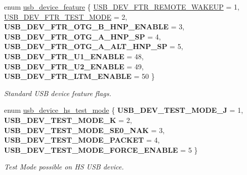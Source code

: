\begin{DoxyCompactItemize}
\item 
enum \hyperlink{group__usb__protocol__group_gab9975b89ad7079085d0300eab037c3ac}{usb\+\_\+device\+\_\+feature} \{ \newline
\hyperlink{group__usb__protocol__group_ggab9975b89ad7079085d0300eab037c3aca378d8545d6f4c12da1249e18e2b18e60}{U\+S\+B\+\_\+\+D\+E\+V\+\_\+\+F\+T\+R\+\_\+\+R\+E\+M\+O\+T\+E\+\_\+\+W\+A\+K\+E\+UP} = 1, 
\hyperlink{group__usb__protocol__group_ggab9975b89ad7079085d0300eab037c3aca127ceb074daad1874fc9c41f5db1c557}{U\+S\+B\+\_\+\+D\+E\+V\+\_\+\+F\+T\+R\+\_\+\+T\+E\+S\+T\+\_\+\+M\+O\+DE} = 2, 
{\bfseries U\+S\+B\+\_\+\+D\+E\+V\+\_\+\+F\+T\+R\+\_\+\+O\+T\+G\+\_\+\+B\+\_\+\+H\+N\+P\+\_\+\+E\+N\+A\+B\+LE} = 3, 
{\bfseries U\+S\+B\+\_\+\+D\+E\+V\+\_\+\+F\+T\+R\+\_\+\+O\+T\+G\+\_\+\+A\+\_\+\+H\+N\+P\+\_\+\+SP} = 4, 
\newline
{\bfseries U\+S\+B\+\_\+\+D\+E\+V\+\_\+\+F\+T\+R\+\_\+\+O\+T\+G\+\_\+\+A\+\_\+\+A\+L\+T\+\_\+\+H\+N\+P\+\_\+\+SP} = 5, 
{\bfseries U\+S\+B\+\_\+\+D\+E\+V\+\_\+\+F\+T\+R\+\_\+\+U1\+\_\+\+E\+N\+A\+B\+LE} = 48, 
{\bfseries U\+S\+B\+\_\+\+D\+E\+V\+\_\+\+F\+T\+R\+\_\+\+U2\+\_\+\+E\+N\+A\+B\+LE} = 49, 
{\bfseries U\+S\+B\+\_\+\+D\+E\+V\+\_\+\+F\+T\+R\+\_\+\+L\+T\+M\+\_\+\+E\+N\+A\+B\+LE} = 50
 \}\begin{DoxyCompactList}\small\item\em Standard U\+SB device feature flags. \end{DoxyCompactList}
\item 
enum \hyperlink{group__usb__protocol__group_ga9027bb283d3666e351fe5c403292cf2e}{usb\+\_\+device\+\_\+hs\+\_\+test\+\_\+mode} \{ \newline
{\bfseries U\+S\+B\+\_\+\+D\+E\+V\+\_\+\+T\+E\+S\+T\+\_\+\+M\+O\+D\+E\+\_\+J} = 1, 
{\bfseries U\+S\+B\+\_\+\+D\+E\+V\+\_\+\+T\+E\+S\+T\+\_\+\+M\+O\+D\+E\+\_\+K} = 2, 
{\bfseries U\+S\+B\+\_\+\+D\+E\+V\+\_\+\+T\+E\+S\+T\+\_\+\+M\+O\+D\+E\+\_\+\+S\+E0\+\_\+\+N\+AK} = 3, 
{\bfseries U\+S\+B\+\_\+\+D\+E\+V\+\_\+\+T\+E\+S\+T\+\_\+\+M\+O\+D\+E\+\_\+\+P\+A\+C\+K\+ET} = 4, 
\newline
{\bfseries U\+S\+B\+\_\+\+D\+E\+V\+\_\+\+T\+E\+S\+T\+\_\+\+M\+O\+D\+E\+\_\+\+F\+O\+R\+C\+E\+\_\+\+E\+N\+A\+B\+LE} = 5
 \}\begin{DoxyCompactList}\small\item\em Test Mode possible on HS U\+SB device. \end{DoxyCompactList}
\item 
\mbox{\label{group__usb__protocol__group_gac9759075d928dc9e928d2dcce5d1102e}} 

\end{DoxyCompactItemize}
